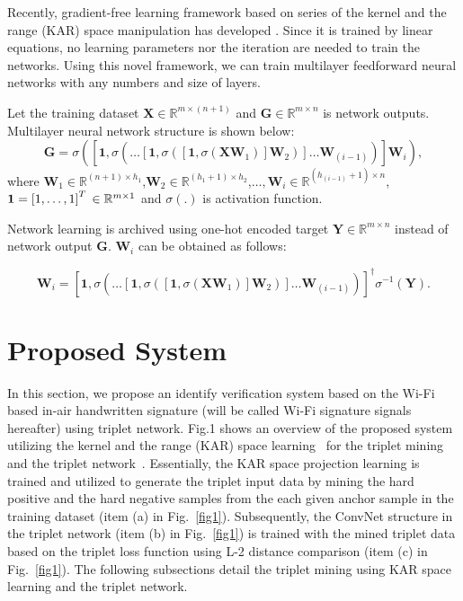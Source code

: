 \documentclass[runningheads]{llncs}
\begin{document}
Recently, gradient-free learning framework based on series of the kernel and the range (KAR) space manipulation has developed \cite{toh2018learning,toh2018gradient}.
Since it is trained by linear equations, no learning parameters nor the iteration are needed to train the networks.
Using this novel framework, we can train multilayer feedforward neural networks with any numbers and size of layers.

Let the training dataset $\mathbf{X}\in{\mathbb{R}}^{m \times (n+1)}$ and $\mathbf{G}\in{\mathbb{R}}^{m \times n}$ is network outputs.
Multilayer neural network structure is shown below:
\begin{equation}
    \mathbf{G} = \sigma\left(\left[\mathbf{1},\sigma\left(\dots\left[\mathbf{1},\sigma\left(\left[\mathbf{1},\sigma\left(\mathbf{X}\mathbf{W}_{1}\right)\right]\mathbf{W}_{2}\right)\right]\dots\mathbf{W}_{(i-1)}\right)\right]\mathbf{W}_{i}\right),
\end{equation}
where $\mathbf{W}_{1}\in{\mathbb{R}}^{(n+1) \times h_{1}}$,$\mathbf{W}_{2}\in{\mathbb{R}}^{(h_{1}+1) \times h_{2}}$,$\dots,\mathbf{W}_{i}\in{\mathbb{R}}^{(h_{(i-1)}+1) \times n}$,$\mathbf{1}=\left[1,\dots,1\right]^{T}\\
\in{\mathbb{R}}^{m \times 1}$ and $\sigma(.)$ is activation function.

Network learning is archived using one-hot encoded target $\mathbf{Y}\in{\mathbb{R}}^{m \times n}$ instead of network output $\mathbf{G}$. $\mathbf{W}_{i}$ can be obtained as follows:

\begin{equation}
    \mathbf{W}_{i} = \left[\mathbf{1},\sigma\left(\dots\left[\mathbf{1},\sigma\left(\left[\mathbf{1},\sigma\left(\mathbf{X}\mathbf{W}_{1}\right)\right]\mathbf{W}_{2}\right)\right]\dots\mathbf{W}_{(i-1)}\right)\right]^{\dagger}\sigma^{-1}\left(\mathbf{Y}\right).
\end{equation}



\section{Proposed System}

In this section, we propose an identify verification system based on the Wi-Fi based in-air handwritten signature (will be called Wi-Fi signature signals hereafter) using triplet network. Fig.1 shows an overview of the proposed system utilizing the kernel and the range (KAR) space learning~\cite{toh2018learning,toh2018gradient} for the triplet mining and the triplet network~\cite{schroff2015facenet}.
Essentially, the KAR space projection learning is trained and utilized to generate the triplet input data by mining the hard positive and the hard negative samples from the each given anchor sample in the training dataset (item (a) in Fig.~\ref{fig1}).
Subsequently, the ConvNet structure in the triplet network (item (b) in Fig.~\ref{fig1}) is trained with the mined triplet data based on the triplet loss function using L-2 distance comparison (item (c) in Fig.~\ref{fig1}).
The following subsections detail the triplet mining using KAR space learning and the triplet network.
\end{document}
